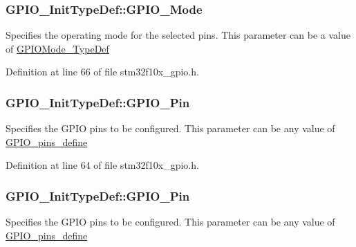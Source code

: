 \subsubsection[{\texorpdfstring{G\+P\+I\+O\+\_\+\+Mode}{GPIO_Mode}}]{ G\+P\+I\+O\+\_\+\+Init\+Type\+Def\+::\+G\+P\+I\+O\+\_\+\+Mode}\hypertarget{struct_g_p_i_o___init_type_def_a55bd77e335c2bfeec9caa5dc922b791b}{}\label{struct_g_p_i_o___init_type_def_a55bd77e335c2bfeec9caa5dc922b791b}
Specifies the operating mode for the selected pins. This parameter can be a value of \hyperlink{openmotestm_2library_2inc_2stm32f10x__gpio_8h_a1347339e1c84a196fabbb31205eec5d4}{G\+P\+I\+O\+Mode\+\_\+\+Type\+Def} 

Definition at line 66 of file stm32f10x\+\_\+gpio.\+h.

\subsubsection[{\texorpdfstring{G\+P\+I\+O\+\_\+\+Pin}{GPIO_Pin}}]{ G\+P\+I\+O\+\_\+\+Init\+Type\+Def\+::\+G\+P\+I\+O\+\_\+\+Pin}\hypertarget{struct_g_p_i_o___init_type_def_a0022c6290548ab169db718d49cad5608}{}\label{struct_g_p_i_o___init_type_def_a0022c6290548ab169db718d49cad5608}
Specifies the G\+P\+IO pins to be configured. This parameter can be any value of \hyperlink{group___g_p_i_o__pins__define}{G\+P\+I\+O\+\_\+pins\+\_\+define} 

Definition at line 64 of file stm32f10x\+\_\+gpio.\+h.

\subsubsection[{\texorpdfstring{G\+P\+I\+O\+\_\+\+Pin}{GPIO_Pin}}]{ G\+P\+I\+O\+\_\+\+Init\+Type\+Def\+::\+G\+P\+I\+O\+\_\+\+Pin}\hypertarget{struct_g_p_i_o___init_type_def_a35fc26fc58226126c5b99478a472e5e9}{}\label{struct_g_p_i_o___init_type_def_a35fc26fc58226126c5b99478a472e5e9}
Specifies the G\+P\+IO pins to be configured. This parameter can be any value of \hyperlink{group___g_p_i_o__pins__define}{G\+P\+I\+O\+\_\+pins\+\_\+define} 

